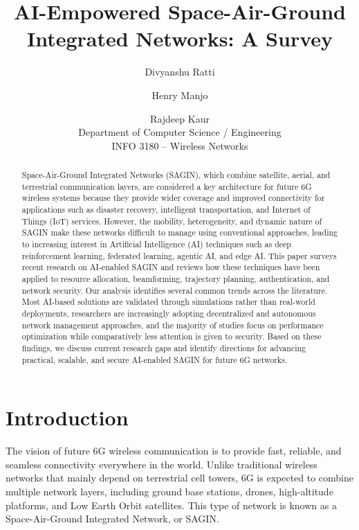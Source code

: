 \documentclass[letterpaper]{article} %
\title{AI-Empowered Space-Air-Ground Integrated Networks: A Survey}
\author{
    Divyanshu Ratti \and Henry Manjo \and Rajdeep Kaur \\
    Department of Computer Science / Engineering \\
    INFO 3180 -- Wireless Networks
}
\begin{document}
\maketitle

\begin{abstract}
Space-Air-Ground Integrated Networks (SAGIN), which combine satellite, aerial, and terrestrial communication layers, are considered a key architecture for future 6G wireless systems because they provide wider coverage and improved connectivity for applications such as disaster recovery, intelligent transportation, and Internet of Things (IoT) services. However, the mobility, heterogeneity, and dynamic nature of SAGIN make these networks difficult to manage using conventional approaches, leading to increasing interest in Artificial Intelligence (AI) techniques such as deep reinforcement learning, federated learning, agentic AI, and edge AI. This paper surveys recent research on AI-enabled SAGIN and reviews how these techniques have been applied to resource allocation, beamforming, trajectory planning, authentication, and network security. Our analysis identifies several common trends across the literature. Most AI-based solutions are validated through simulations rather than real-world deployments, researchers are increasingly adopting decentralized and autonomous network management approaches, and the majority of studies focus on performance optimization while comparatively less attention is given to security. Based on these findings, we discuss current research gaps and identify directions for advancing practical, scalable, and secure AI-enabled SAGIN for future 6G networks.
\end{abstract}

\section{Introduction}
The vision of future 6G wireless communication is to provide fast, reliable, and seamless connectivity everywhere in the world. Unlike traditional wireless networks that mainly depend on terrestrial cell towers, 6G is expected to combine multiple network layers, including ground base stations, drones, high-altitude platforms, and Low Earth Orbit satellites. This type of network is known as a Space-Air-Ground Integrated Network, or SAGIN.
\end{document}
